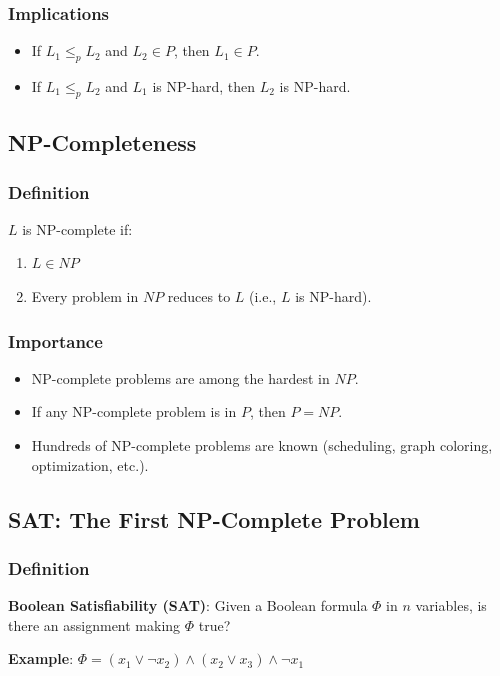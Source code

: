 \documentclass[11pt]{article}
\begin{document}
{{{\subsubsection*{Implications}
\begin{itemize}
\item If $L_1 \le_p L_2$ and $L_2 \in P$, then $L_1 \in P$.
\item If $L_1 \le_p L_2$ and $L_1$ is NP-hard, then $L_2$ is NP-hard.
\end{itemize}

\subsection*{NP-Completeness}

\subsubsection*{Definition}
$L$ is NP-complete if:
\begin{enumerate}
\item $L \in NP$
\item Every problem in $NP$ reduces to $L$ (i.e., $L$ is NP-hard).
\end{enumerate}

\subsubsection*{Importance}
\begin{itemize}
\item NP-complete problems are among the hardest in $NP$.
\item If any NP-complete problem is in $P$, then $P = NP$.
\item Hundreds of NP-complete problems are known (scheduling, graph coloring, optimization, etc.).
\end{itemize}

\subsection*{SAT: The First NP-Complete Problem}

\subsubsection*{Definition}
\textbf{Boolean Satisfiability (SAT)}: Given a Boolean formula $\Phi$ in $n$ variables, is there an assignment making $\Phi$ true?

\textbf{Example}: $\Phi = (x_1 \vee \neg x_2) \wedge (x_2 \vee x_3) \wedge \neg x_1$

}}}
\end{document}
